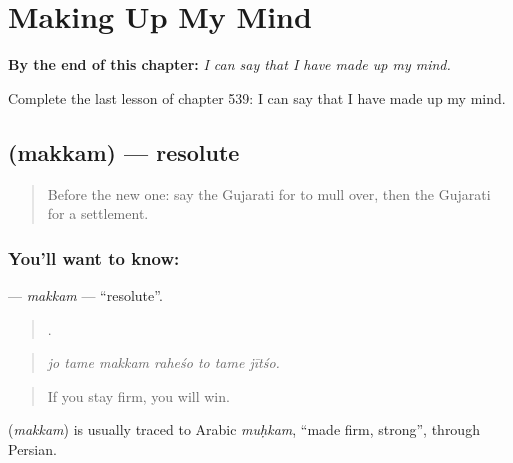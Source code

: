 
\chapter{Making Up My Mind}
\label{ch:gu-making-up-my-mind}

\begin{chapteropening}
\textbf{By the end of this chapter:} \emph{I can say that I have made up my mind.}

Complete the last lesson of chapter 539: I can say that I have made up my mind.
\end{chapteropening}

\section[\texorpdfstring{\gu{મક્કમ} (makkam)}{મક્કમ (makkam)}]{ (makkam) — resolute}

\label{lesson:GU-C539-makkam}



\begin{quote}
Before the new one: say the Gujarati for to mull over, then the Gujarati for a settlement.
\end{quote}

\subsection*{You'll want to know: }
\textbf{} — \emph{makkam} — \textquotedblleft{}resolute\textquotedblright{}.

\begin{quote}
      .
\end{quote}

\begin{quote}
\emph{jo tame makkam raheśo to tame jītśo.}
\end{quote}

\begin{quote}
If you stay firm, you will win.
\end{quote}

\begin{cousinweb}
\textbf{} (\emph{makkam}) is usually traced to Arabic \emph{muḥkam}, \textquotedblleft{}made firm, strong\textquotedblright{}, through Persian.
\end{cousinweb}

